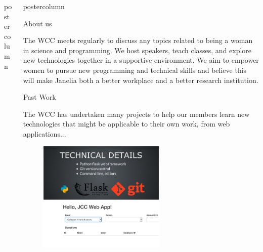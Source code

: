 \documentclass{beamer}
\newlength{\columnheight}
\begin{document}
\begin{frame}
\begin{columns}
\begin{column}{.33\textwidth}
\begin{beamercolorbox}[center,wd=\textwidth]{postercolumn}
\begin{minipage}[T]{.95\textwidth}
{		}\end{minipage}\end{beamercolorbox}
	\end{column}
  \begin{column}{.33\textwidth}
		\begin{beamercolorbox}[center,wd=\textwidth]{postercolumn}
			\begin{minipage}[T]{.95\textwidth}
				\parbox[t][\columnheight]{\textwidth}{
					\begin{myblock}{About us}
                        \begin{addmargin}[1em]{1em}
                            The WCC meets regularly to discuss any topics related to being a woman in science and programming. We host speakers, teach classes, and explore new technologies together in a supportive environment. We aim to empower women to pursue new programming and technical skills and believe this will make Janelia both a better workplace and a better research institution. 
                        \end{addmargin}
                    \end{myblock}
                    \vspace{1cm}
                    \begin{myblock}{Past Work}
                        \begin{addmargin}[.5em]{.5em}
                            The WCC has undertaken many projects to help our members learn new technologies that might be applicable to their own work, from web applications...
                        \end{addmargin}
                        \begin{addmargin}[1em]{1em}
                            \begin{figure}
                                \vspace{.5cm}
                                \centering\includegraphics[width=0.59\textwidth]{img/web_app_wcc.png}
                                \vspace{.5cm}
                            \end{figure}
                        \end{addmargin}
                        

\end{myblock}}
\end{minipage}
\end{beamercolorbox}
\end{column}
\end{columns}
\end{frame}
\end{document}
